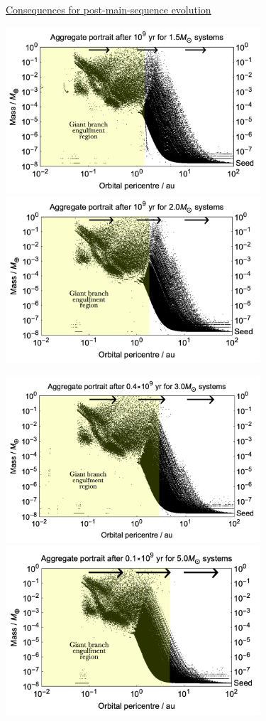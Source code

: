 \documentclass[useAMS,usenatbib]{mn2e}
\begin{document}
\begin{figure}
\centerline{\Huge \underline{Consequences for post-main-sequence evolution}}
\centerline{}
\centerline{}
\centerline{
\includegraphics[width=9.5cm]{PlotGBM15}
\includegraphics[width=9.5cm]{PlotGBM20}
}
\centerline{}
\centerline{
\includegraphics[width=9.5cm]{PlotGBM30}
\includegraphics[width=9.5cm]{PlotGBM50}
}
\end{figure}
\end{document}
